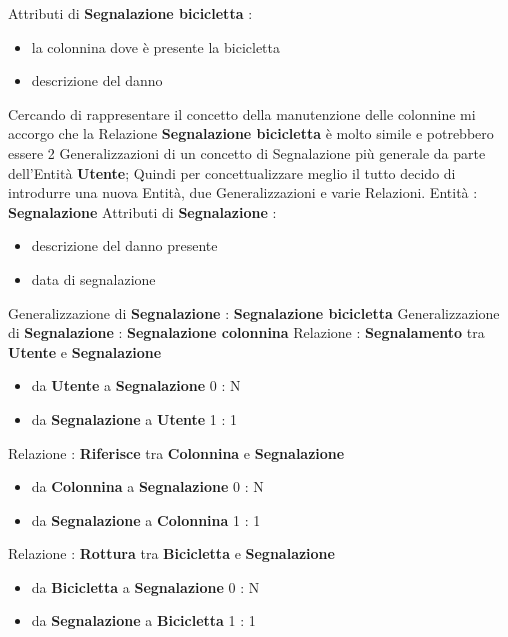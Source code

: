 \documentclass[a4paper,twoside]{article}
\begin{document}
Attributi di \textbf{Segnalazione bicicletta} :
\begin{itemize}
 \item la colonnina dove è presente la bicicletta
 \item descrizione del danno
\end{itemize}
Cercando di rappresentare il concetto della manutenzione delle colonnine mi accorgo che la Relazione \textbf{Segnalazione bicicletta} è molto simile e potrebbero essere 2 Generalizzazioni di un concetto di Segnalazione più generale da parte dell'Entità \textbf{Utente};\newline
Quindi per concettualizzare meglio il tutto decido di introdurre una nuova Entità, due Generalizzazioni e varie Relazioni.\newline
Entità : \textbf{Segnalazione}\newline
Attributi di \textbf{Segnalazione} :
\begin{itemize}
 \item descrizione del danno presente
 \item data di segnalazione
\end{itemize}
Generalizzazione di \textbf{Segnalazione} : \textbf{Segnalazione bicicletta}\newline
Generalizzazione di \textbf{Segnalazione} : \textbf{Segnalazione colonnina}\newline
Relazione : \textbf{Segnalamento} tra \textbf{Utente} e \textbf{Segnalazione}
\begin{itemize}
 \item da \textbf{Utente} a \textbf{Segnalazione} 0 : N
 \item da \textbf{Segnalazione} a \textbf{Utente} 1 : 1
\end{itemize}
Relazione : \textbf{Riferisce} tra \textbf{Colonnina} e \textbf{Segnalazione}
\begin{itemize}
 \item da \textbf{Colonnina} a \textbf{Segnalazione} 0 : N
 \item da \textbf{Segnalazione} a \textbf{Colonnina} 1 : 1
\end{itemize}
Relazione : \textbf{Rottura} tra \textbf{Bicicletta} e \textbf{Segnalazione}
\begin{itemize}
 \item da \textbf{Bicicletta} a \textbf{Segnalazione} 0 : N
 \item da \textbf{Segnalazione} a \textbf{Bicicletta} 1 : 1
\end{itemize}
\end{document}
